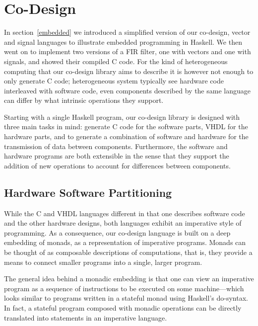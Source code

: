 \documentclass[../main.tex]{subfiles}
\begin{document}
\chapter{Co-Design}
\label{codesign}

In section~\ref{embedded} we introduced a simplified version of our co-design, vector and signal languages to illustrate embedded programming in Haskell. We then went on to implement two versions of a FIR filter, one with vectors and one with signals, and showed their compiled C code. For the kind of heterogeneous computing that our co-design library aims to describe it is however not enough to only generate C code; heterogeneous system typically see hardware code interleaved with software code, even components described by the same language can differ by what intrinsic operations they support.


Starting with a single Haskell program, our co-design library is designed with three main tasks in mind: generate C code for the software parts, VHDL for the hardware parts, and to generate a combination of software and hardware for the transmission of data between components. Furthermore, the software and hardware programs are both extensible in the sense that they support the addition of new operations to account for differences between components.

\section{Hardware Software Partitioning}
\label{program}

While the C and VHDL languages different in that one describes software code and the other hardware designs, both languages exhibit an imperative style of programming. As a consequence, our co-design language is built on a deep embedding of monads, as a representation of imperative programs. Monads can be thought of as composable descriptions of computations, that is, they provide a means to connect smaller programs into a single, larger program.

The general idea behind a monadic embedding is that one can view an imperative program as a sequence of instructions to be executed on some machine---which looks similar to programs written in a stateful monad using Haskell's do-syntax. In fact, a stateful program composed with monadic operations can be directly translated into statements in an imperative language.
\end{document}
